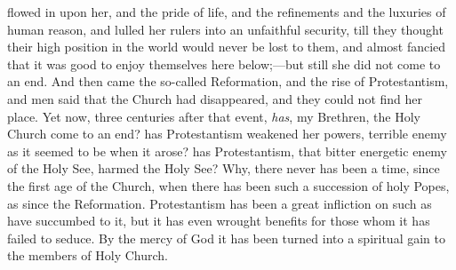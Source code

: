 flowed in upon her, and the pride of life, and the
refinements and the luxuries of human reason, and lulled
her rulers into an unfaithful security, till they thought
their high position in the world would never be lost to
them, and almost fancied that it was good to enjoy
themselves here below;—but still she did not come to
an end. And then came the so-called Reformation, and the
rise of Protestantism, and men said that the Church had
disappeared, and they could not find her place. Yet now,
three centuries after that event, \emph{has}, my
Brethren, the Holy Church come to an end? has
Protestantism weakened her powers, terrible enemy as it
seemed to be when it arose? has Protestantism, that
bitter energetic enemy of the Holy See, harmed the Holy
See? Why, there never has been a time, since the first
age of the Church, when there has been such a succession
of holy Popes, as since the Reformation. Protestantism
has been a great infliction on such as have succumbed to it, but it has even wrought benefits for those whom it
has failed to seduce. By the mercy of God it has been
turned into a spiritual gain to the members of Holy
Church.

